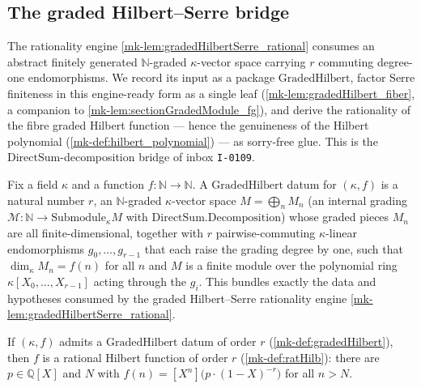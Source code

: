 \subsection{The graded Hilbert--Serre bridge}
\label{mk-subsec:graded_hilbert_bridge}

The rationality engine \ref{mk-lem:gradedHilbertSerre_rational} consumes an
abstract finitely generated \(\mathbb{N}\)-graded \(\kappa\)-vector space
carrying \(r\) commuting degree-one endomorphisms.  We record its input as a
package \(\mathrm{GradedHilbert}\), factor Serre finiteness in this engine-ready
form as a single leaf (\ref{mk-lem:gradedHilbert_fiber}, a companion to
\ref{mk-lem:sectionGradedModule_fg}), and derive the rationality of the fibre
graded Hilbert function --- hence the genuineness of the Hilbert polynomial
(\ref{mk-def:hilbert_polynomial}) --- as sorry-free glue.  This is the
\(\mathrm{DirectSum}\)-decomposition bridge of inbox \texttt{I-0109}.

\begin{definition}
  \label{mk-def:gradedHilbert}
  \leanok
  Fix a field \(\kappa\) and a function \(f : \mathbb{N} \to \mathbb{N}\).  A
  \(\mathrm{GradedHilbert}\) datum for \((\kappa, f)\) is a natural number \(r\),
  an \(\mathbb{N}\)-graded \(\kappa\)-vector space \(M = \bigoplus_n M_n\) (an
  internal grading \(\mathcal{M} : \mathbb{N} \to \mathrm{Submodule}_\kappa M\)
  with \(\mathrm{DirectSum.Decomposition}\)) whose graded pieces \(M_n\) are all
  finite-dimensional, together with \(r\) pairwise-commuting \(\kappa\)-linear
  endomorphisms \(g_0, \dots, g_{r-1}\) that each raise the grading degree by one,
  such that \(\dim_\kappa M_n = f(n)\) for all \(n\) and \(M\) is a finite module
  over the polynomial ring \(\kappa[X_0, \dots, X_{r-1}]\) acting through the
  \(g_i\).  This bundles exactly the data and hypotheses consumed by the graded
  Hilbert--Serre rationality engine \ref{mk-lem:gradedHilbertSerre_rational}.
\end{definition}

\begin{lemma}
  \label{mk-lem:gradedHilbert_isRatHilb}
  \leanok
  If \((\kappa, f)\) admits a \(\mathrm{GradedHilbert}\) datum of order \(r\)
  (\ref{mk-def:gradedHilbert}), then \(f\) is a rational Hilbert function of order
  \(r\) (\ref{mk-def:ratHilb}): there are \(p \in \mathbb{Q}[X]\) and \(N\) with
  \(f(n) = [X^n]\bigl(p \cdot (1-X)^{-r}\bigr)\) for all \(n > N\).
\end{lemma}

